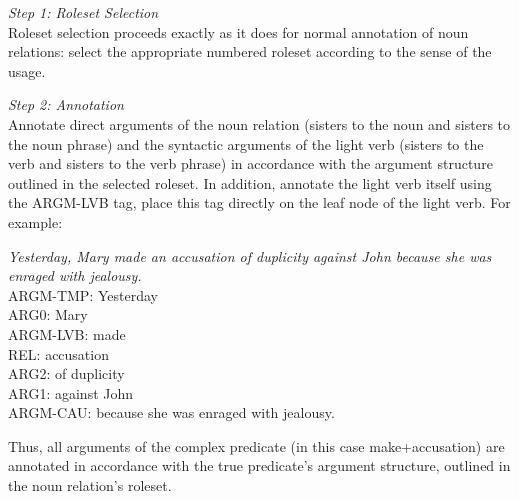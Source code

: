 \documentclass[11pt]{report}
\begin{document}
\textit{Step 1: Roleset Selection}\\
Roleset selection proceeds exactly as it does for normal annotation of noun relations: select the appropriate numbered roleset according to the sense of the usage.  

\textit{Step 2: Annotation}\\
Annotate direct arguments of the noun relation (sisters to the noun and sisters to the noun phrase) and the syntactic arguments of the light verb (sisters to the verb and sisters to the verb phrase) in accordance with the argument structure outlined in the selected roleset.  In addition, annotate the light verb itself using the ARGM-LVB tag, place this tag directly on the leaf node of the light verb.  For example:

\textit{Yesterday, Mary made an accusation of duplicity against John because she was enraged with jealousy.}\\
ARGM-TMP: Yesterday\\
ARG0: Mary\\
ARGM-LVB: made\\
REL: accusation\\
ARG2: of duplicity\\
ARG1: against John\\
ARGM-CAU: because she was enraged with jealousy.

Thus, all arguments of the complex predicate (in this case make+accusation) are annotated in accordance with the true predicate's argument structure, outlined in the noun relation's roleset. 
\end{document}
